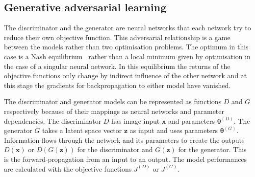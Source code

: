 \documentclass[twocolumn]{article}
\numberwithin{equation}{section}
\begin{document}

\subsection{Generative adversarial learning}
The discriminator and the generator are neural networks that each network try to reduce their own objective function. 
This adversarial relationship is a game between the models rather than two optimisation problems. The optimum in this 
case is a Nash equilibrium~\cite{NIPS16} rather than a local minimum given by optimisation in the case of a singular 
neural network. In this equilibrium the returns of the objective functions only change by indirect influence of the 
other network and at this stage the gradients for backpropagation to either model have vanished.

The discriminator and generator models can be represented as functions $D$ and $G$ respectively because of their 
mappings as neural networks and parameter dependencies. The discriminator $D$ has image input $\mathbf{x}$ and parameters 
$\bm{\theta}^{(D)}$. The generator $G$ takes a latent space vector $\mathbf{z}$ as input and uses parameters 
$\bm{\theta}^{(G)}$. Information flows through the network and its parameters to create the outputs $D(\mathbf{x})$ or 
$D(G(\mathbf{z}))$ for the discriminator and $G(\mathbf{z})$ for the generator. This is the forward-propagation from 
an input to an output. The model performances are calculated with the objective functions $J^{(D)}$ or $J^{(G)}$. 
\end{document}
